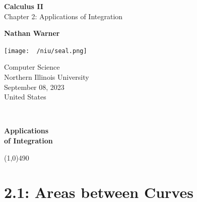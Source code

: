 \documentclass{report}
\title{\Huge{}}
\author{\huge{Nathan Warner}}
\date{\huge{}}
\begin{document}
        \begin{titlepage}
       \begin{center}
           \vspace*{1cm}
    
           \textbf{Calculus II} \\
           Chapter 2: Applications of Integration
    
           \vspace{0.5cm}
            
                
           \vspace{1.5cm}
    
           \textbf{Nathan Warner}
    
           \vfill
                
                
           \vspace{0.8cm}
         
           \texttt{[image: ~/niu/seal.png]}
                
           Computer Science \\
           Northern Illinois University\\
           September 08, 2023 \\
           United States\\
           
                
       \end{center}
    \end{titlepage}
    \tableofcontents
    \pagebreak \bigbreak \noindent
    \vspace{2in} \\
    \begin{Huge}
        \textbf{Applications \\ of Integration}
    \end{Huge}
    \bigbreak \noindent 
    \line(1,0){490}
    \bigbreak \noindent 
    \section*{\LARGE 2.1: Areas between Curves}
    \bigbreak \noindent 
\end{document}
